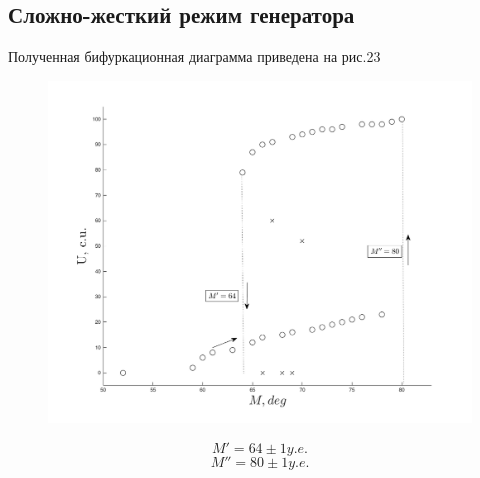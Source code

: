 \subsection{Сложно-жесткий режим генератора}
Полученная бифуркационная диаграмма приведена на рис.23
\begin{center}
    \begin{figure}[H]
        \vspace{-10pt}
            \includegraphics[width=\linewidth]{graph/g3} 
            \vspace{-10pt}
            \label{fig:10}
            \vspace{-40pt}
    \end{figure}
\end{center} 
$$M'= 64 \pm 1 y.e.$$ $$M''= 80 \pm 1 y.e.$$ 
